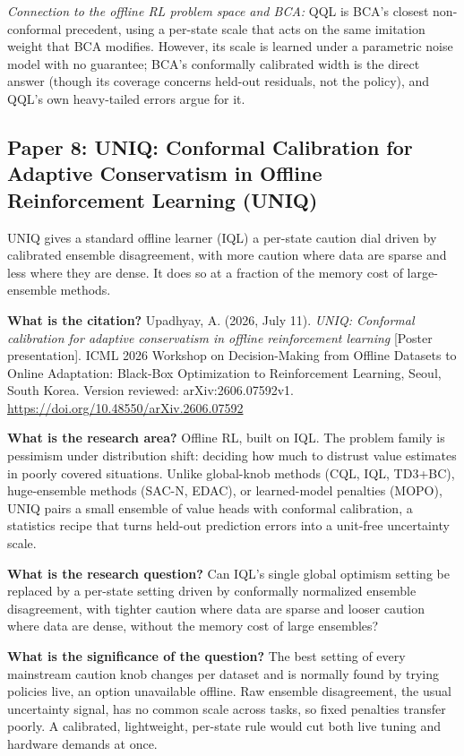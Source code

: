 \documentclass[11pt]{article}
\newcommand{\paper}[1]{\subsection*{#1}}
\newcommand{\q}[2]{\item \textbf{#1} #2}
\newcommand{\tiein}[1]{\par\smallskip\noindent\emph{Connection to the offline RL problem space and BCA:} #1\par\medskip}
\begin{document}
\tiein{QQL is BCA's closest non-conformal precedent, using a per-state scale that acts on the same imitation weight that BCA modifies. However, its scale is learned under a parametric noise model with no guarantee; BCA's conformally calibrated width is the direct answer (though its coverage concerns held-out residuals, not the policy), and QQL's own heavy-tailed errors argue for it.}

\paper{Paper 8: UNIQ: Conformal Calibration for Adaptive Conservatism in Offline Reinforcement Learning (UNIQ)}
UNIQ gives a standard offline learner (IQL) a per-state caution dial driven by calibrated ensemble disagreement, with more caution where data are sparse and less where they are dense. It does so at a fraction of the memory cost of large-ensemble methods.
\begin{qna}

\q{What is the citation?}
Upadhyay, A. (2026, July 11). \emph{UNIQ: Conformal calibration for adaptive conservatism in offline reinforcement learning} [Poster presentation]. ICML 2026 Workshop on Decision-Making from Offline Datasets to Online Adaptation: Black-Box Optimization to Reinforcement Learning, Seoul, South Korea. Version reviewed: arXiv:2606.07592v1. \url{https://doi.org/10.48550/arXiv.2606.07592}

\q{What is the research area?}
Offline RL, built on IQL. The problem family is pessimism under distribution shift: deciding how much to distrust value estimates in poorly covered situations. Unlike global-knob methods (CQL, IQL, TD3+BC), huge-ensemble methods (SAC-N, EDAC), or learned-model penalties (MOPO), UNIQ pairs a small ensemble of value heads with conformal calibration, a statistics recipe that turns held-out prediction errors into a unit-free uncertainty scale.

\q{What is the research question?}
Can IQL's single global optimism setting be replaced by a per-state setting driven by conformally normalized ensemble disagreement, with tighter caution where data are sparse and looser caution where data are dense, without the memory cost of large ensembles?

\q{What is the significance of the question?}
The best setting of every mainstream caution knob changes per dataset and is normally found by trying policies live, an option unavailable offline. Raw ensemble disagreement, the usual uncertainty signal, has no common scale across tasks, so fixed penalties transfer poorly. A calibrated, lightweight, per-state rule would cut both live tuning and hardware demands at once.


\end{qna}
\end{document}
